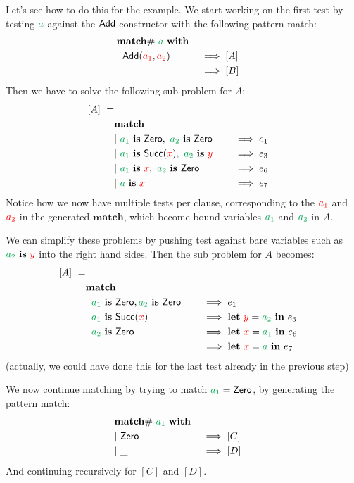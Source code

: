 \documentclass[a4paper, 11pt]{article}
\theoremstyle{definition}
\begin{document}
Let's see how to do this for the example. We start working on the first test by testing $\ba$ against the $\mathsf{\textcolor{black}{Add}}$ constructor with the following pattern match:
\begin{alignat*}{4}
  \matchwithZ{\ba} \\
  \clause{\Add(\fvar{a_1}, \fvar{a_2})}{[A]} \\
  \clause{\_}{[B]}
\end{alignat*}
Then we have to solve the following sub problem for $A$:
\begin{alignat*}{4}
  [A]\ =\\
  \matchclauses \\
  \clause{\bvar{a_1} \is \Zero,\ \bvar{a_2} \is \Zero}{e_1} \\
  \clause{\bvar{a_1} \is \Succ(\fvar x),\ \bvar{a_2} \is \fvar y}{e_3} \\
  \clause{\bvar{a_1} \is \fvar x,\ \bvar{a_2} \is \Zero}{e_6} \\
  \clause{\ba \is \fvar x}{e_7}
\end{alignat*}
Notice how we now have multiple tests per clause, corresponding to the $\textcolor{red}{a_1}$ and $\textcolor{red}{a_2}$ in the generated $\mathbf{match}$, which become bound variables $\bvar{a_1}$ and $\bvar{a_2}$ in $A$.

We can simplify these problems by pushing test against bare variables such as $\bvar{a_2} \is \fvar y$ into the right hand sides. Then the sub problem for $A$ becomes:
\begin{alignat*}{4}
  [A]\ =\\
  \matchclauses \\
  \clause{\bvar{a_1} \is \Zero, \bvar{a_2} \is \Zero}{e_1} \\
  \clause{\bvar{a_1} \is \Succ(\fvar x)}{\lett{\fvar y}{\bvar{a_2}} e_3} \\
  \clause{\bvar{a_2} \is \Zero}{\lett{\fvar x}{\bvar{a_1}} e_6} \\
  \clause{}{\lett{\fvar x}{\bvar{a}} e_7}
\end{alignat*}
(actually, we could have done this for the last test already in the previous step)

We now continue matching by trying to match $\bvar{a_1} = \Zero$, by generating the pattern match:
\begin{alignat*}{4}
  \matchwithZ{\bvar{a_1}} \\
  \clause{\Zero}{[C]} \\
  \clause{\_}{[D]}
\end{alignat*}
And continuing recursively for $[C]$ and $[D]$.
\end{document}
